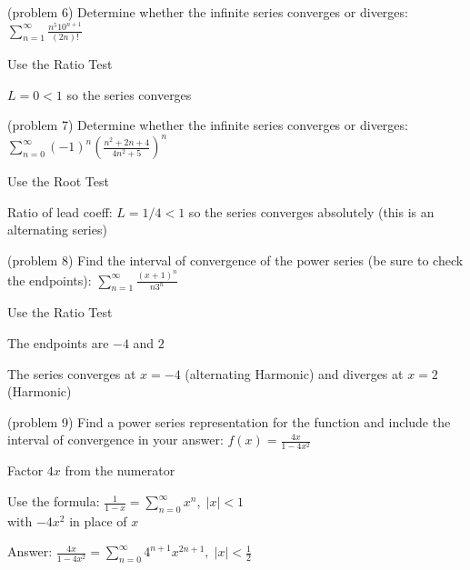 \documentclass[handout]{ximera}
\begin{document}
\begin{problem}(problem 6)
Determine whether the infinite series converges or diverges: 
$\displaystyle \sum_{n=1}^\infty \frac{n^5 10^{n+1}}{(2n)!}$

\begin{hint}
Use the Ratio Test
\end{hint}

\begin{hint}
$L = 0 < 1$ so the series converges
\end{hint}

\end{problem}


\begin{problem}(problem 7)
Determine whether the infinite series converges or diverges: 
$\displaystyle \sum_{n=0}^\infty (-1)^n\left(\frac{n^2 + 2n+ 4}{4n^2 + 5}\right)^n$

\begin{hint}
Use the Root Test
\end{hint}

\begin{hint}
Ratio of lead coeff: $L = 1/4 < 1$ so the series converges absolutely (this is an alternating series)
\end{hint}

\end{problem}

\begin{problem} (problem 8)
Find the interval of convergence of the power series (be sure to check the endpoints):
$\displaystyle \sum_{n=1}^\infty \frac{(x + 1)^n}{n 3^n}$

\begin{hint}
Use the Ratio Test
\end{hint}
\begin{hint}
The endpoints are $-4$ and $2$
\end{hint}
\begin{hint}
The series converges at $x = -4$ (alternating Harmonic) and diverges at $x = 2$ (Harmonic)
\end{hint}

\end{problem}


\begin{problem} (problem 9)
Find a power series representation for the function and include the interval of convergence in your answer:
$\displaystyle f(x) = \frac{4x}{1 - 4x^2}$

\begin{hint}
Factor $4x$ from the numerator
\end{hint}
\begin{hint}
Use the formula: $\displaystyle \frac{1}{1-x} = \sum_{n = 0}^\infty x^n, \; |x| <1$\\
with $-4x^2$ in place of $x$
\end{hint}

\begin{hint}
Answer: 
$\displaystyle \frac{4x}{1-4x^2} = \sum_{n = 0}^\infty 4^{n+1}x^{2n+1} , \; |x| <\frac12$
\end{hint}

\end{problem}
\end{document}
